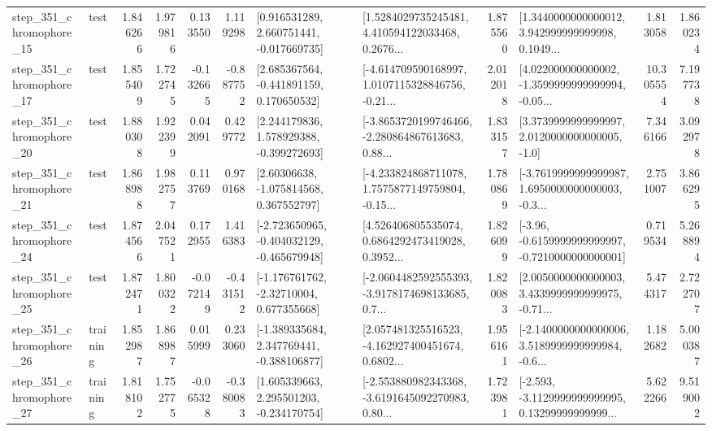 \begin{tabular}{llrrrrllrlrr}
  step\_351\_chromophore\_15 &      test &      1.846266 &    1.979816 &      0.133550 &  1.119298 &    [0.916531289, 2.660751441, -0.017669735] &  [1.5284029735245481, 4.410594122033468, 0.2676... &       1.875560 &  [1.3440000000000012, 3.942999999999998, 0.1049... &            1.813058 &          1.860234 \\
  step\_351\_chromophore\_17 &      test &      1.855409 &    1.722745 &     -0.132665 & -0.887752 &    [2.685367564, -0.441891159, 0.170650532] &  [-4.614709590168997, 1.0107115328846756, -0.21... &       2.012018 &  [4.022000000000002, -1.3599999999999994, -0.05... &           10.305554 &          7.197738 \\
  step\_351\_chromophore\_20 &      test &      1.880308 &    1.922399 &      0.042091 &  0.429772 &    [2.244179836, 1.578929388, -0.399272693] &  [-3.8653720199746466, -2.280864867613683, 0.88... &       1.833157 &     [3.3739999999999997, 2.0120000000000005, -1.0] &            7.346166 &          3.092978 \\
  step\_351\_chromophore\_21 &      test &      1.868988 &    1.982757 &      0.113769 &  0.970168 &     [2.60306638, -1.075814568, 0.367552797] &  [-4.233824868711078, 1.7575877149759804, -0.15... &       1.780869 &  [-3.7619999999999987, 1.6950000000000003, -0.3... &            2.751007 &          3.866295 \\
  step\_351\_chromophore\_24 &      test &      1.874566 &    2.047521 &      0.172955 &  1.416383 &  [-2.723650965, -0.404032129, -0.465679948] &  [4.526406805535074, 0.6864292473419028, 0.3952... &       1.826099 &  [-3.96, -0.6159999999999997, -0.7210000000000001] &            0.719534 &          5.268894 \\
  step\_351\_chromophore\_25 &      test &      1.872471 &    1.800322 &     -0.072149 & -0.431512 &    [-1.176761762, -2.32710004, 0.677355668] &  [-2.0604482592555393, -3.9178174698133685, 0.7... &       1.820083 &  [2.0050000000000003, 3.4339999999999975, -0.71... &            5.474317 &          2.722707 \\
  step\_351\_chromophore\_26 &  training &      1.852987 &    1.868987 &      0.015999 &  0.233060 &   [-1.389335684, 2.347769441, -0.388106877] &  [2.057481325516523, -4.162927400451674, 0.6802... &       1.956161 &  [-2.1400000000000006, 3.5189999999999984, -0.6... &            1.182682 &          5.000387 \\
  step\_351\_chromophore\_27 &  training &      1.818102 &    1.752775 &     -0.065328 & -0.380083 &    [1.605339663, 2.295501203, -0.234170754] &  [-2.553880982343368, -3.6191645092270983, 0.80... &       1.723981 &  [-2.593, -3.1129999999999995, 0.13299999999999... &            5.622266 &          9.519002 \\

\end{tabular}
